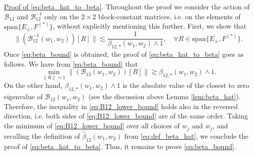 \documentclass[10pt]{amsart}
\numberwithin{equation}{section}
\begin{document}
\underline{Proof of \eqref{eq:beta_hat_to_beta}}. Throughout the proof we consider the action of $\mathcal{B}_{12}$ and $\mathcal{B}_{12}^{-1}$ only on the $2\times 2$ block-constant matrices, i.e. on the elements of $\mathrm{span}\{E_\pm,F^{(*)}\}$, without explicitly mentioning this further. First, we show that
\begin{equation}
\|\left(\mathcal{B}_{12}^{-1}(w_1,w_2)\right)[R]\|\lesssim \frac{1}{\beta_{12,*}(w_1,w_2)\wedge 1},\quad \forall R\in\mathrm{span}\{E_\pm,F^{(*)}\}.
\label{eq:beta_bound} 
\end{equation}
Once \eqref{eq:beta_bound} is obtained, the proof of \eqref{eq:beta_hat_to_beta} goes as follows. We have from \eqref{eq:beta_bound} that
\begin{equation}
\min_{\|R\|=1} \left\lVert\left(\mathcal{B}_{12}(w_1,w_2)\right)[R]\right\rVert\gtrsim \beta_{12,*}(w_1,w_2)\wedge 1.
\label{eq:B12_lower_bound}
\end{equation}
On the other hand, $\beta_{12,*}(w_1,w_2)\wedge 1$ is the absolute value of the closest to zero eigenvalue of $\mathcal{B}_{12}(w_1,w_2)$ (see the discussion above Lemma \ref{lem:beta_hat}). Therefore, the inequality in \eqref{eq:B12_lower_bound} holds also in the reversed direction, i.e. both sides of \eqref{eq:B12_lower_bound} are of the same order. Taking the minimum of \eqref{eq:B12_lower_bound} over all choices of $w_j$ and $\overline{w}_j$, and recalling the definition of $\widehat{\beta}_{12}(w_1,w_2)$ from \eqref{eq:def_beta_hat}, we conclude the proof of \eqref{eq:beta_hat_to_beta}. Thus, it remains to prove \eqref{eq:beta_bound}.
\end{document}
